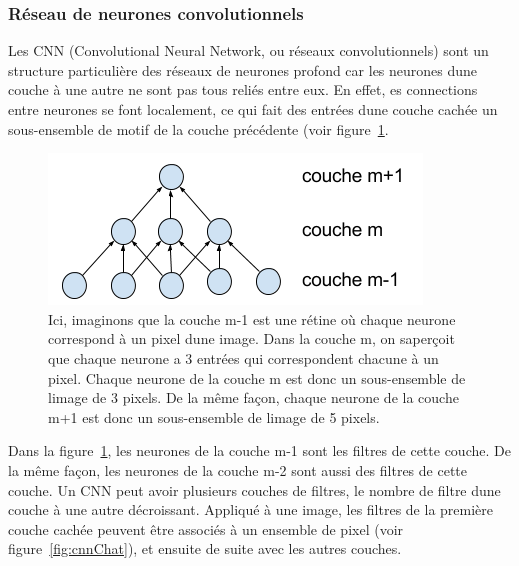 \documentclass[11pt]{sdm}
\begin{document}
		\subsubsection{R\'eseau de neurones convolutionnels}
			Les CNN (Convolutional Neural Network, ou r\'eseaux convolutionnels) sont un structure particuli\`ere des r\'eseaux de neurones profond car les neurones d\textquotesingle une couche \`a une autre ne sont pas tous reli\'es entre eux. En effet, es connections entre neurones se font localement, ce qui fait des entr\'ees d\textquotesingle une couche cach\'ee un sous-ensemble de motif de la couche pr\'ec\'edente (voir figure~\ref{fig:cnn}.

			\begin{figure}[!ht]
				\centering
				\includegraphics[natwidth=375,natheight=152]{figures/architectureCNN.png}
				\caption{Ici, imaginons que la couche m-1 est une r\'etine o\`u chaque neurone correspond \`a un pixel d\textquotesingle une image. Dans la couche m, on s\textquotesingle aper\c coit que chaque neurone a 3 entr\'ees qui correspondent chacune \`a un pixel. Chaque neurone de la couche m est donc un sous-ensemble de l\textquotesingle image de 3 pixels. De la m\^eme fa\c con, chaque neurone de la couche m+1 est donc un sous-ensemble de l\textquotesingle image de 5 pixels.}
				\label{fig:cnn}
			\end{figure}

			Dans la figure~\ref{fig:cnn}, les neurones de la couche m-1 sont les filtres de cette couche. De la m\^eme fa\c con, les neurones de la couche m-2 sont aussi des filtres de cette couche. Un CNN peut avoir plusieurs couches de filtres, le nombre de filtre d\textquotesingle une couche \`a une autre d\'ecroissant.
			Appliqu\'e \`a une image, les filtres de la premi\`ere couche cach\'ee peuvent \^etre associ\'es \`a un ensemble de pixel (voir figure~\ref{fig:cnnChat}), et ensuite de suite avec les autres couches.
\end{document}
